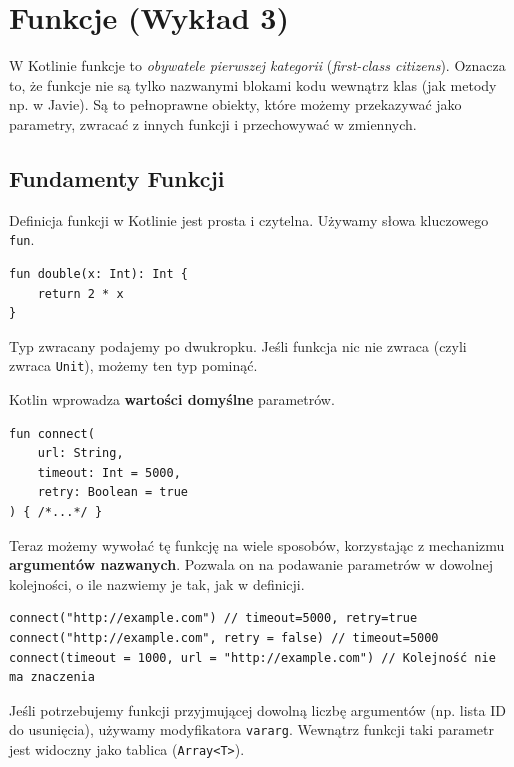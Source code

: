 \chapter{Funkcje (Wykład 3)}

W Kotlinie funkcje to \textit{obywatele pierwszej kategorii} (\textit{first-class citizens}). Oznacza to, że funkcje nie są tylko nazwanymi blokami kodu wewnątrz klas (jak metody np. w Javie). Są to pełnoprawne obiekty, które możemy przekazywać jako parametry, zwracać z innych funkcji i przechowywać w zmiennych.

\section{Fundamenty Funkcji}

Definicja funkcji w Kotlinie jest prosta i czytelna. Używamy słowa kluczowego \texttt{fun}.

\begin{verbatim}
fun double(x: Int): Int {
    return 2 * x
}
\end{verbatim}

Typ zwracany podajemy po dwukropku. Jeśli funkcja nic nie zwraca (czyli zwraca \texttt{Unit}), możemy ten typ pominąć.


Kotlin wprowadza \textbf{wartości domyślne} parametrów.

\begin{verbatim}
fun connect(
    url: String, 
    timeout: Int = 5000, 
    retry: Boolean = true
) { /*...*/ }
\end{verbatim}

Teraz możemy wywołać tę funkcję na wiele sposobów, korzystając z mechanizmu \textbf{argumentów nazwanych}. Pozwala on na podawanie parametrów w dowolnej kolejności, o ile nazwiemy je tak, jak w definicji.

\begin{verbatim}
connect("http://example.com") // timeout=5000, retry=true
connect("http://example.com", retry = false) // timeout=5000
connect(timeout = 1000, url = "http://example.com") // Kolejność nie ma znaczenia
\end{verbatim}

Jeśli potrzebujemy funkcji przyjmującej dowolną liczbę argumentów (np. lista ID do usunięcia), używamy modyfikatora \texttt{vararg}. Wewnątrz funkcji taki parametr jest widoczny jako tablica (\texttt{Array<T>}).

